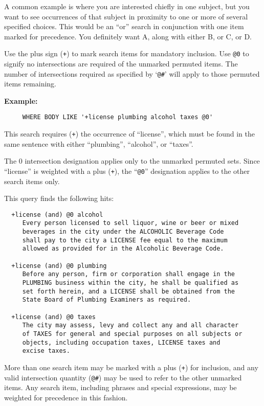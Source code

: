 A common example is where you are interested chiefly in one subject,
but you want to see occurrences of that subject in proximity to one or
more of several specified choices.  This would be an ``or'' search in
conjunction with one item marked for precedence.  You definitely want
A, along with either B, or C, or D.

Use the plus sign (\verb`+`) to mark search items for mandatory
inclusion.  Use \verb`@0` to signify no intersections are required of
the unmarked permuted items.  The number of intersections required as
specified by `\verb`@#`' will apply to those permuted items remaining.

{\bf Example:}
\begin{verbatim}
     WHERE BODY LIKE '+license plumbing alcohol taxes @0'
\end{verbatim}

This search requires (\verb`+`) the occurrence of ``license'', which
must be found in the same sentence with either ``plumbing'',
``alcohol'', or ``taxes''.

The 0 intersection designation applies only to the unmarked permuted
sets.  Since ``license'' is weighted with a plus (\verb`+`), the
``\verb`@0`'' designation applies to the other search items only.

This query finds the following hits:

\begin{verbatim}
  +license (and) @0 alcohol
     Every person licensed to sell liquor, wine or beer or mixed
     beverages in the city under the ALCOHOLIC Beverage Code
     shall pay to the city a LICENSE fee equal to the maximum
     allowed as provided for in the Alcoholic Beverage Code.

  +license (and) @0 plumbing
     Before any person, firm or corporation shall engage in the
     PLUMBING business within the city, he shall be qualified as
     set forth herein, and a LICENSE shall be obtained from the
     State Board of Plumbing Examiners as required.

  +license (and) @0 taxes
     The city may assess, levy and collect any and all character
     of TAXES for general and special purposes on all subjects or
     objects, including occupation taxes, LICENSE taxes and
     excise taxes.
\end{verbatim}

More than one search item may be marked with a plus (\verb`+`) for
inclusion, and any valid intersection quantity (\verb`@#`) may be used
to refer to the other unmarked items.  Any search item, including
phrases and special expressions, may be weighted for precedence in
this fashion.

